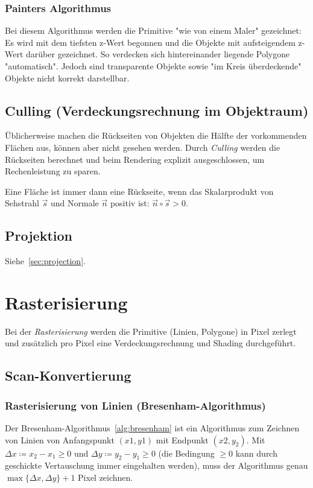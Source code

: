 			\subsubsection{Painters Algorithmus}
				Bei diesem Algorithmus werden die Primitive "wie von einem Maler" gezeichnet: Es wird mit dem tiefsten z-Wert begonnen und die Objekte mit aufsteigendem z-Wert darüber gezeichnet. So verdecken sich hintereinander liegende Polygone "automatisch". Jedoch sind transparente Objekte sowie "im Kreis überdeckende" Objekte nicht korrekt darstellbar.

		\subsection{Culling (Verdeckungsrechnung im Objektraum)}
			Üblicherweise machen die Rückseiten von Objekten \ca die Hälfte der vorkommenden Flächen aus, können aber nicht gesehen werden. Durch \emph{Culling} werden die Rückseiten berechnet und beim Rendering explizit ausgeschlossen, um Rechenleistung zu sparen.
			
			Eine Fläche ist immer dann eine Rückseite, wenn das Skalarprodukt von Sehstrahl \( \vec{s} \) und Normale \( \vec{n} \) positiv ist: \( \vec{n} \circ \vec{s} > 0 \).

		\subsection{Projektion}
			Siehe~\ref{sec:projection}.

	\section{Rasterisierung}
		Bei der \emph{Rasterisierung} werden die Primitive (Linien, Polygone) in Pixel zerlegt und zusätzlich pro Pixel eine Verdeckungsrechnung und Shading durchgeführt.

		\subsection{Scan-Konvertierung}
			\subsubsection{Rasterisierung von Linien (Bresenham-Algorithmus)}
				Der Bresenham-Algorithmus~\ref{alg:bresenham} ist ein Algorithmus zum Zeichnen von Linien von Anfangspunkt \( (x1, y1) \) mit Endpunkt \( (x2, y_2) \). Mit \( \Delta x \coloneqq x_2 - x_1 \geq 0 \) und \( \Delta y \coloneqq y_2 - y_1 \geq 0 \) (die Bedingung \( \geq 0 \) kann durch geschickte Vertauschung immer eingehalten werden), muss der Algorithmus genau \( \max \big\{ \Delta x, \Delta y \big\} + 1 \) Pixel zeichnen.
				
